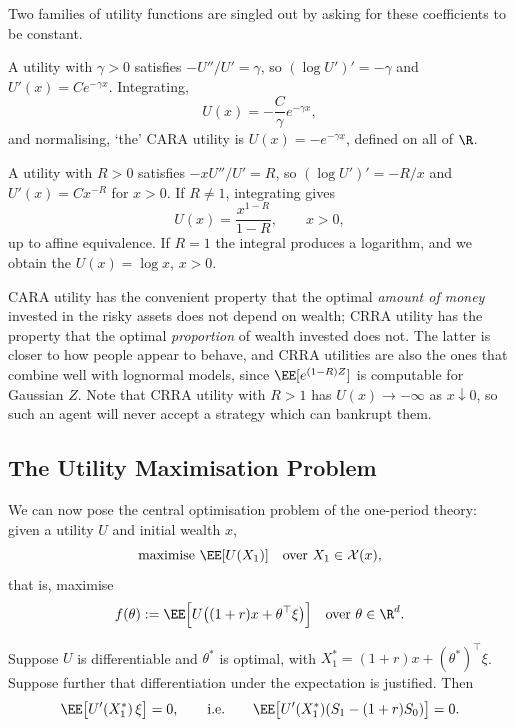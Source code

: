 Two families of utility functions are singled out by asking for these coefficients to be constant.

\begin{example}
	A utility with  $\gamma > 0$ satisfies $-U''/U' = \gamma$, so $(\log U')' = -\gamma$ and $U'(x) = Ce^{-\gamma x}$. Integrating,
	$$
	U(x) = -\frac{C}{\gamma}e^{-\gamma x},
	$$
	and normalising, `the' CARA utility is $U(x) = -e^{-\gamma x}$, defined on all of $\R$.
\end{example}

\begin{example}
	A utility with  $R > 0$ satisfies $-xU''/U' = R$, so $(\log U')' = -R/x$ and $U'(x) = Cx^{-R}$ for $x > 0$. If $R \neq 1$, integrating gives
	$$
	U(x) = \frac{x^{1-R}}{1-R}, \qquad x > 0,
	$$
	up to affine equivalence. If $R = 1$ the integral produces a logarithm, and we obtain the  $U(x) = \log x$, $x > 0$.
\end{example}

\begin{remark}
	CARA utility has the convenient property that the optimal \emph{amount of money} invested in the risky assets does not depend on wealth; CRRA utility has the property that the optimal \emph{proportion} of wealth invested does not. The latter is closer to how people appear to behave, and CRRA utilities are also the ones that combine well with lognormal models, since $\EE[e^{(1-R)Z}]$ is computable for Gaussian $Z$. Note that CRRA utility with $R > 1$ has $U(x) \to -\infty$ as $x \downarrow 0$, so such an agent will never accept a strategy which can bankrupt them.
\end{remark}

\subsection{The Utility Maximisation Problem}

We can now pose the central optimisation problem of the one-period theory: given a utility $U$ and initial wealth $x$,
$$
\text{maximise } \EE[U(X_1)] \quad \text{over } X_1 \in \mathcal{X}(x),
$$
that is, maximise
$$
f(\theta) := \EE\Big[U\big((1+r)x + \theta^\top \xi\big)\Big] \quad \text{over } \theta \in \R^d.
$$

\begin{theorem}\label{sfm-thm:foc}
	Suppose $U$ is differentiable and $\theta^*$ is optimal, with $X_1^* = (1+r)x + (\theta^*)^\top\xi$. Suppose further that differentiation under the expectation is justified. Then
	$$
	\EE\big[U'(X_1^*)\,\xi\big] = 0, \qquad \text{i.e.} \qquad \EE\big[U'(X_1^*)(S_1 - (1+r)S_0)\big] = 0.
	$$
\end{theorem}

